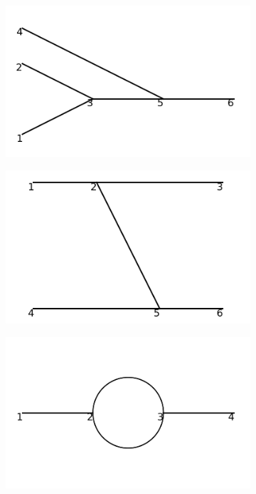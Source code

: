 \documentclass[11pt,a4paper,twoside,pdf]{article}
\numberwithin{equation}{section}
\begin{document}
\begin{figure}[h!]
    \centering
    \begin{subfigure}[t]{0.24\textwidth}
        \centering
        \includegraphics[width=\textwidth]{plots/order2/from_order1/1.png}
        \caption{ }
        \label{fig:order2_from_order1/1}
    \end{subfigure}%
    \hfill
    \begin{subfigure}[t]{0.24\textwidth}
        \centering
        \includegraphics[width=\textwidth]{plots/order2/from_order1/2.png}
        \caption{ }
        \label{fig:order2_from_order1/2}
    \end{subfigure}
    \hfill
    \begin{subfigure}[t]{0.24\textwidth}
        \centering
        \includegraphics[width=\textwidth]{plots/order2/from_order1/3.png}

\end{subfigure}
\end{figure}
\end{document}
